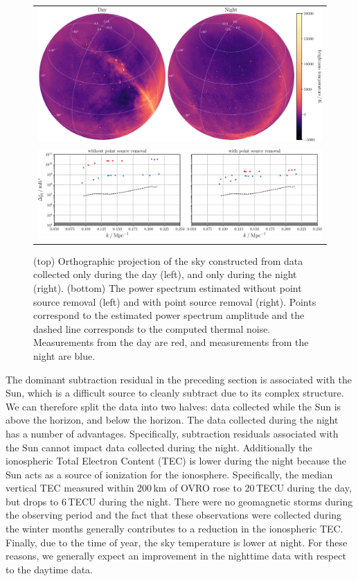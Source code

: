 \begin{bibunit}
\begin{figure}[t]
    \centering
    \begin{tabular}{c}
        \includegraphics[width=\textwidth]{figures/chapter4/day-night}\\
        \includegraphics[width=\textwidth]{figures/chapter4/spherical-power-spectrum-day-night}\\
    \end{tabular}
    \caption{
        (top) Orthographic projection of the sky constructed from data collected only during the day
        (left), and only during the night (right).
        (bottom) The power spectrum estimated without point source removal (left) and with point
        source removal (right). Points correspond to the estimated power spectrum amplitude and the
        dashed line corresponds to the computed thermal noise. Measurements from the day are red,
        and measurements from the night are blue.
    }
    \label{fig:spherical-power-spectra-day-night}
\end{figure}

The dominant subtraction residual in the preceding section is associated with the Sun, which is a
difficult source to cleanly subtract due to its complex structure. We can therefore split the data
into two halves: data collected while the Sun is above the horizon, and below the horizon. The data
collected during the night has a number of advantages. Specifically, subtraction residuals
associated with the Sun cannot impact data collected during the night.  Additionally the ionospheric
Total Electron Content (TEC) is lower during the night because the Sun acts as a source of
ionization for the ionosphere. Specifically, the median vertical TEC measured within 200\,km of OVRO
rose to 20\,TECU during the day, but drops to 6\,TECU during the night. There were no geomagnetic
storms during the observing period and the fact that these observations were collected during the
winter months generally contributes to a reduction in the ionospheric TEC.  Finally, due to the time
of year, the sky temperature is lower at night. For these reasons, we generally expect an
improvement in the nighttime data with respect to the daytime data.


\end{bibunit}
